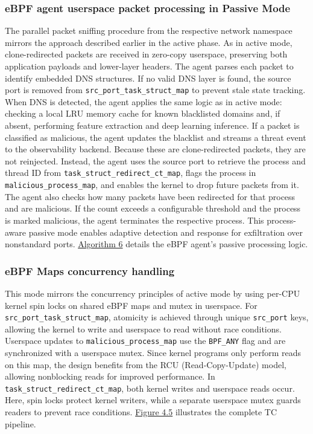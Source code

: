 \documentclass [11pt, proquest] {uwthesis}[2020/02/24]
\begin{document}
\subsubsection{\textbf{eBPF agent userspace packet processing in Passive Mode}}
\label{passive:sec2}
The parallel packet sniffing procedure from the respective network namespace mirrors the approach described earlier in the active phase. As in active mode, clone-redirected packets are received in zero-copy userspace, preserving both application payloads and lower-layer headers. The agent parses each packet to identify embedded DNS structures. If no valid DNS layer is found, the source port is removed from \texttt{src\_port\_task\_struct\_map} to prevent stale state tracking. When DNS is detected, the agent applies the same logic as in active mode: checking a local LRU memory cache for known blacklisted domains and, if absent, performing feature extraction and deep learning inference.
If a packet is classified as malicious, the agent updates the blacklist and streams a threat event to the observability backend. Because these are clone-redirected packets, they are not reinjected. Instead, the agent uses the source port to retrieve the process and thread ID from \texttt{task\_struct\_redirect\_ct\_map}, flags the process in \texttt{malicious\_process\_map}, and enables the kernel to drop future packets from it. The agent also checks how many packets have been redirected for that process and are malicious. If the count exceeds a configurable threshold and the process is marked malicious, the agent terminates the respective process.
This process-aware passive mode enables adaptive detection and response for exfiltration over nonstandard ports. \hyperref[sec:alg6]{Algorithm 6} details the eBPF agent's passive processing logic.

\subsubsection{\textbf{eBPF Maps concurrency handling}}
\label{passive:sec3}
This mode mirrors the concurrency principles of active mode by using per-CPU kernel spin locks on shared eBPF maps and mutex in userspace. For \texttt{src\_port\_task\_struct\_map}, atomicity is achieved through unique \texttt{src\_port} keys, allowing the kernel to write and userspace to read without race conditions. Userspace updates to \texttt{malicious\_process\_map} use the \texttt{BPF\_ANY} flag and are synchronized with a userspace mutex. Since kernel programs only perform reads on this map, the design benefits from the RCU (Read-Copy-Update) model, allowing nonblocking reads for improved performance. In \texttt{task\_struct\_redirect\_ct\_map}, both kernel writes and userspace reads occur. Here, spin locks protect kernel writers, while a separate userspace mutex guards readers to prevent race conditions.
\hyperref[sec:dp-passive-phase]{Figure 4.5} illustrates the complete TC pipeline.
\end{document}
